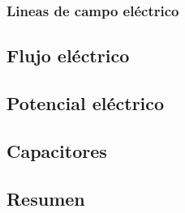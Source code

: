 \subsubsection{Lineas de campo eléctrico}



\subsection{Flujo eléctrico}



\subsection{Potencial eléctrico}



\subsection{Capacitores}



\subsection{Resumen}

